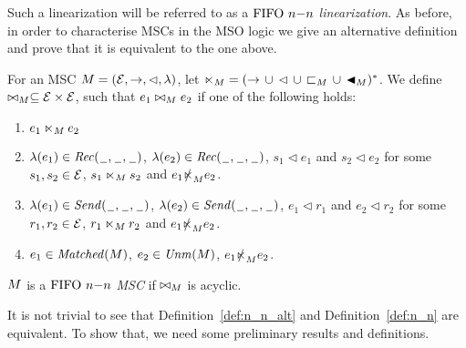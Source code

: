 Such a linearization will be referred to as a \emph{$\nn$ linearization}. 
As before, in order to characterise \nn MSCs in the MSO logic we give an alternative definition and prove that it is equivalent to the one above.






\begin{definition} [$\nn$ alternative]\label{def:n_n_alt}
	For an MSC $M = (\mathcal{E},\to,\lhd,\lambda)$, let ${\ltimes}_M = ({\to} \,\cup\, {\lhd} \,\cup\, {\sqsubset_M} \,\cup\, {\blacktriangleleft_M})^\ast$. We define  $\bowtie_M \subseteq \mathcal{E} \times \mathcal{E}$,  such that $e_1 \bowtie_M e_2$ if one of the following holds:
	\begin{enumerate}%
		\item $e_1 \ltimes_M e_2$
		\item $\lambda(e_1) \in {\mathit{Rec}(\hspace{0.1em}\underline{\hspace{0.5em}}\hspace{0.1em},\hspace{0.1em}\underline{\hspace{0.5em}}\hspace{0.1em},\hspace{0.1em}\underline{\hspace{0.5em}}\hspace{0.1em})}$, $\lambda(e_2) \in {\mathit{Rec}(\hspace{0.1em}\underline{\hspace{0.5em}}\hspace{0.1em},\hspace{0.1em}\underline{\hspace{0.5em}}\hspace{0.1em},\hspace{0.1em}\underline{\hspace{0.5em}}\hspace{0.1em})}$, $s_1 \lhd e_1$ and $s_2 \lhd e_2$ for some $s_1,s_2 \in \mathcal{E}$, $s_1 \ltimes_M s_2$ and $e_1 \slashed{\ltimes}_M e_2$.
		\item $\lambda(e_1) \in {\mathit{Send}(\hspace{0.1em}\underline{\hspace{0.5em}}\hspace{0.1em},\hspace{0.1em}\underline{\hspace{0.5em}}\hspace{0.1em},\hspace{0.1em}\underline{\hspace{0.5em}}\hspace{0.1em})}$, $\lambda(e_2) \in {\mathit{Send}(\hspace{0.1em}\underline{\hspace{0.5em}}\hspace{0.1em},\hspace{0.1em}\underline{\hspace{0.5em}}\hspace{0.1em},\hspace{0.1em}\underline{\hspace{0.5em}}\hspace{0.1em})}$, $e_1 \lhd r_1$ and $e_2 \lhd r_2$ for some $r_1,r_2 \in \mathcal{E}$, $r_1 \ltimes_M r_2$ and $e_1 \slashed{\ltimes}_M e_2$.
		\item $e_1 \in \mathit{Matched}(M)$, $e_2 \in \mathit{Unm}(M)$, $e_1 \slashed{\ltimes}_M e_2$.
	\end{enumerate}
	
	$M $ is a \emph{$\nn$ MSC}
	if ${\bowtie_M}$ is acyclic.
\end{definition}

It is not trivial to see that Definition~\ref{def:n_n_alt} and Definition~\ref{def:n_n} are equivalent. To show that, we need some preliminary results and definitions. 


